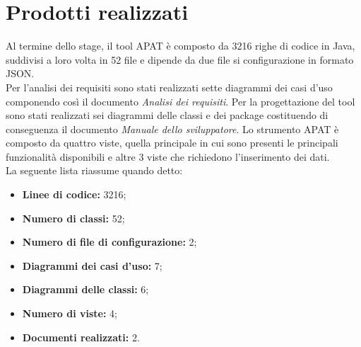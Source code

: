 
\section{Prodotti realizzati}\label{sec:prodotti-ottenuti}

Al termine dello stage, il tool APAT è composto da 3216 righe di codice in Java, suddivisi a loro volta in 52 file e dipende da due file si configurazione in formato JSON.\\
Per l'analisi dei requisiti sono stati realizzati sette diagrammi dei casi d'uso componendo così il documento \textit{Analisi dei requisiti}.
Per la progettazione del tool sono stati realizzati sei diagrammi delle classi e dei package costituendo di conseguenza il documento \textit{Manuale dello sviluppatore}.
Lo strumento APAT è composto da quattro viste, quella principale in cui sono presenti le principali funzionalità disponibili e altre 3 viste che richiedono l'inserimento dei dati.\\
La seguente lista riassume quando detto:

\begin{itemize}
    \item \textbf{Linee di codice:} 3216;
    \item \textbf{Numero di classi:} 52;
    \item \textbf{Numero di file di configurazione:} 2;
    \item \textbf{Diagrammi dei casi d'uso:} 7;
    \item \textbf{Diagrammi delle classi:} 6;
    \item \textbf{Numero di viste:} 4;
    \item \textbf{Documenti realizzati:} 2.
\end{itemize}